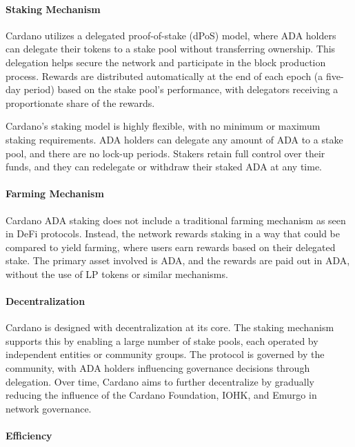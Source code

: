 \documentclass[12pt,parskip=full, tikz]{article}
\begin{document}
\paragraph{Staking Mechanism}

Cardano utilizes a delegated proof-of-stake (dPoS) model, where ADA holders can delegate their tokens to a stake pool without transferring ownership. This delegation helps secure the network and participate in the block production process. Rewards are distributed automatically at the end of each epoch (a five-day period) based on the stake pool's performance, with delegators receiving a proportionate share of the rewards.

Cardano’s staking model is highly flexible, with no minimum or maximum staking requirements. ADA holders can delegate any amount of ADA to a stake pool, and there are no lock-up periods. Stakers retain full control over their funds, and they can redelegate or withdraw their staked ADA at any time.

\paragraph{Farming Mechanism}

Cardano ADA staking does not include a traditional farming mechanism as seen in DeFi protocols. Instead, the network rewards staking in a way that could be compared to yield farming, where users earn rewards based on their delegated stake. The primary asset involved is ADA, and the rewards are paid out in ADA, without the use of LP tokens or similar mechanisms.

\paragraph{Decentralization}

Cardano is designed with decentralization at its core. The staking mechanism supports this by enabling a large number of stake pools, each operated by independent entities or community groups. The protocol is governed by the community, with ADA holders influencing governance decisions through delegation. Over time, Cardano aims to further decentralize by gradually reducing the influence of the Cardano Foundation, IOHK, and Emurgo in network governance.

\paragraph{Efficiency}
\end{document}
